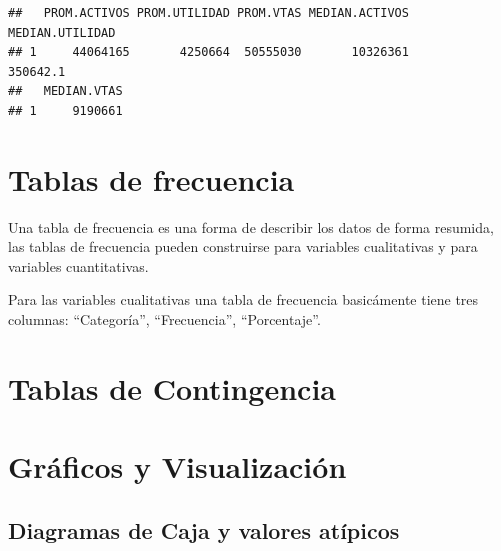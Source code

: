 \documentclass[]{book}
\newenvironment{Shaded}{\begin{snugshade}}{\end{snugshade}}
\newcommand{\KeywordTok}[1]{\textcolor[rgb]{0.13,0.29,0.53}{\textbf{#1}}}
\newcommand{\DataTypeTok}[1]{\textcolor[rgb]{0.13,0.29,0.53}{#1}}
\newcommand{\StringTok}[1]{\textcolor[rgb]{0.31,0.60,0.02}{#1}}
\newcommand{\OperatorTok}[1]{\textcolor[rgb]{0.81,0.36,0.00}{\textbf{#1}}}
\newcommand{\NormalTok}[1]{#1}
\begin{document}
\begin{Shaded}
\end{Shaded}

\begin{verbatim}
##   PROM.ACTIVOS PROM.UTILIDAD PROM.VTAS MEDIAN.ACTIVOS MEDIAN.UTILIDAD
## 1     44064165       4250664  50555030       10326361        350642.1
##   MEDIAN.VTAS
## 1     9190661
\end{verbatim}

\section{Tablas de frecuencia}\label{tablas-de-frecuencia}

Una tabla de frecuencia es una forma de describir los datos de forma
resumida, las tablas de frecuencia pueden construirse para variables
cualitativas y para variables cuantitativas.

Para las variables cualitativas una tabla de frecuencia basicámente
tiene tres columnas: ``Categoría'', ``Frecuencia'', ``Porcentaje''.

\section{Tablas de Contingencia}\label{tablas-de-contingencia}

\section{Gráficos y Visualización}\label{graficos-y-visualizacion}

\subsection{Diagramas de Caja y valores
atípicos}\label{diagramas-de-caja-y-valores-atipicos}
\end{document}
